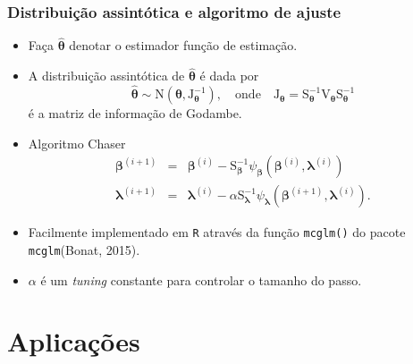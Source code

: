 \documentclass[10pt, aspectratio=169]{beamer}\usepackage[]{graphicx}\usepackage[]{color}
\begin{document}
\begin{frame}[c]
\frametitle{Distribuição assintótica e algoritmo de ajuste}
\begin{itemize}
\item Faça $\boldsymbol{\hat{\theta}}$ denotar o estimador função de estimação.
\item A distribuição assintótica de $\boldsymbol{\hat{\theta}}$ é dada por 
\begin{equation*}
\boldsymbol{\hat{\theta}} \sim \mathrm{N}(\boldsymbol{\theta}, \mathrm{J}_{\boldsymbol{\theta}}^{-1}), \quad
\text{onde} \quad
\mathrm{J}_{\boldsymbol{\theta}} =  \mathrm{S}_{\boldsymbol{\theta}}^{-1}\mathrm{V}_{\boldsymbol{\theta}}\mathrm{S}_{\boldsymbol{\theta}}^{-1}
\end{equation*}
é a matriz de informação de Godambe.
\item Algoritmo Chaser
\begin{eqnarray*}
\label{chaser}
\boldsymbol{\beta}^{(i+1)} &=& \boldsymbol{\beta}^{(i)} - \mathrm{S}_{\boldsymbol{\beta}}^{-1} \psi_{\boldsymbol{\beta}}(\boldsymbol{\beta}^{(i)}, \boldsymbol{\lambda}^{(i)}) \nonumber \\
\boldsymbol{\lambda}^{(i+1)} &=& \boldsymbol{\lambda}^{(i)} - \alpha \mathrm{S}_{\boldsymbol{\lambda}}^{-1} \psi_{\boldsymbol{\lambda}}(\boldsymbol{\beta}^{(i+1)}, \boldsymbol{\lambda}^{(i)}).
\end{eqnarray*}
\item Facilmente implementado em \texttt{R} através da função \texttt{mcglm()}
do pacote \texttt{mcglm}(Bonat, 2015).
\item $\alpha$ é um \textit{tuning} constante para controlar o tamanho do passo.
\end{itemize}
\end{frame}

\section{Aplicações}
\label{Section5}



\end{document}
